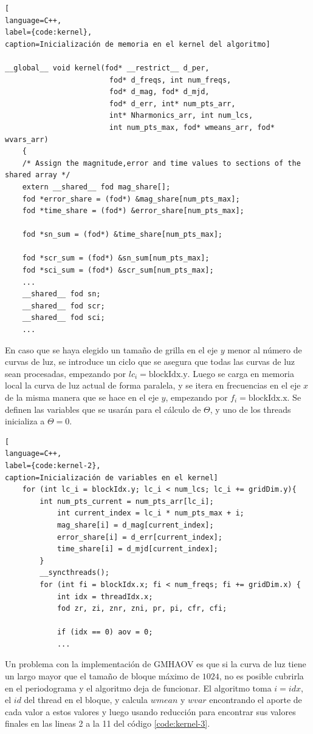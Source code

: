 \begin{lstlisting}[
language=C++,
label={code:kernel},
caption=Inicialización de memoria en el kernel del algoritmo]
    
__global__ void kernel(fod* __restrict__ d_per,
                        fod* d_freqs, int num_freqs,
                        fod* d_mag, fod* d_mjd,
                        fod* d_err, int* num_pts_arr,
                        int* Nharmonics_arr, int num_lcs,
                        int num_pts_max, fod* wmeans_arr, fod* wvars_arr)
    {
    /* Assign the magnitude,error and time values to sections of the shared array */
    extern __shared__ fod mag_share[];
    fod *error_share = (fod*) &mag_share[num_pts_max];
    fod *time_share = (fod*) &error_share[num_pts_max];

    fod *sn_sum = (fod*) &time_share[num_pts_max];

    fod *scr_sum = (fod*) &sn_sum[num_pts_max];
    fod *sci_sum = (fod*) &scr_sum[num_pts_max];
    ...
    __shared__ fod sn;
    __shared__ fod scr;
    __shared__ fod sci;
    ...
\end{lstlisting}
En caso que se haya elegido un tamaño de grilla en el eje $y$ menor al número de curvas de luz, se introduce un ciclo que se asegura que todas las curvas de luz sean procesadas, empezando por $lc_i = \text{blockIdx.y}$. Luego se carga en memoria local la curva de luz actual de forma paralela, y se itera en frecuencias en el eje $x$ de la misma manera que se hace en el eje $y$, empezando por $f_i = \text{blockIdx.x}$. Se definen las variables que se usarán para el cálculo de $\Theta$, y uno de los threads inicializa a $\Theta=0$.
\begin{lstlisting}[
language=C++,
label={code:kernel-2},
caption=Inicialización de variables en el kernel]
    for (int lc_i = blockIdx.y; lc_i < num_lcs; lc_i += gridDim.y){
        int num_pts_current = num_pts_arr[lc_i];
            int current_index = lc_i * num_pts_max + i;
            mag_share[i] = d_mag[current_index];
            error_share[i] = d_err[current_index];
            time_share[i] = d_mjd[current_index]; 
        }
        __syncthreads();
        for (int fi = blockIdx.x; fi < num_freqs; fi += gridDim.x) {
            int idx = threadIdx.x;
            fod zr, zi, znr, zni, pr, pi, cfr, cfi;

            if (idx == 0) aov = 0;
            ...
\end{lstlisting}
Un problema con la implementación de GMHAOV es que si la curva de luz tiene un largo mayor que el tamaño de bloque máximo de $1024$, no es posible cubrirla en el periodograma y el algoritmo deja de funcionar. El algoritmo toma $i=idx$, el $id$ del thread en el bloque, y calcula $wmean$ y $wvar$ encontrando el aporte de cada valor a estos valores y luego usando reducción para encontrar sus valores finales en las lineas 2 a la 11 del código \ref{code:kernel-3}.
